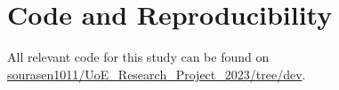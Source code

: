 \documentclass[%
 reprint,
 amsmath,amssymb,
 aps,nofootinbib
]{revtex4-2}
\begin{document}



\section{\label{perf}Code and Reproducibility }
All relevant code for this study can be found on \href{https://github.com/sourasen1011/UoE_Research_Project_2023/tree/dev}{sourasen1011/UoE\_Research\_Project\_2023/tree/dev}.


\cite{*}

\end{document}
